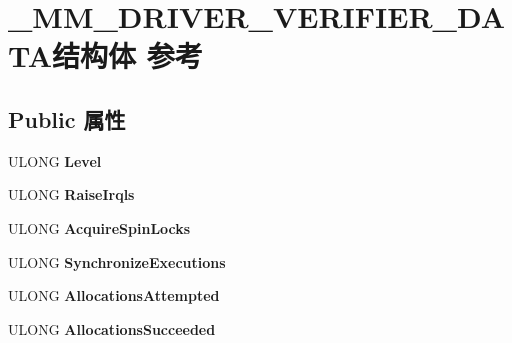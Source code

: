 \hypertarget{struct___m_m___d_r_i_v_e_r___v_e_r_i_f_i_e_r___d_a_t_a}{}\section{\+\_\+\+M\+M\+\_\+\+D\+R\+I\+V\+E\+R\+\_\+\+V\+E\+R\+I\+F\+I\+E\+R\+\_\+\+D\+A\+T\+A结构体 参考}
\label{struct___m_m___d_r_i_v_e_r___v_e_r_i_f_i_e_r___d_a_t_a}
\subsection*{Public 属性}
\begin{DoxyCompactItemize}
\item 
\mbox{\label{struct___m_m___d_r_i_v_e_r___v_e_r_i_f_i_e_r___d_a_t_a_a24fd0476c45a33240d45b668cc41d1b7}} 
U\+L\+O\+NG {\bfseries Level}
\item 
\mbox{\label{struct___m_m___d_r_i_v_e_r___v_e_r_i_f_i_e_r___d_a_t_a_a2d34ba7d3272ee4463085a491995ced9}} 
U\+L\+O\+NG {\bfseries Raise\+Irqls}
\item 
\mbox{\label{struct___m_m___d_r_i_v_e_r___v_e_r_i_f_i_e_r___d_a_t_a_ab4a3dc1160b3e72e9dafcd0b8b101bda}} 
U\+L\+O\+NG {\bfseries Acquire\+Spin\+Locks}
\item 
\mbox{\label{struct___m_m___d_r_i_v_e_r___v_e_r_i_f_i_e_r___d_a_t_a_a7bd91d51458a29a8e861ae80c36b8b0a}} 
U\+L\+O\+NG {\bfseries Synchronize\+Executions}
\item 
\mbox{\label{struct___m_m___d_r_i_v_e_r___v_e_r_i_f_i_e_r___d_a_t_a_abfaa905319a5faff8221b1ad9ee47025}} 
U\+L\+O\+NG {\bfseries Allocations\+Attempted}
\item 
\mbox{\label{struct___m_m___d_r_i_v_e_r___v_e_r_i_f_i_e_r___d_a_t_a_a4474ca3d5707c197737aacddf2d6ecd1}} 
U\+L\+O\+NG {\bfseries Allocations\+Succeeded}

\end{DoxyCompactItemize}
